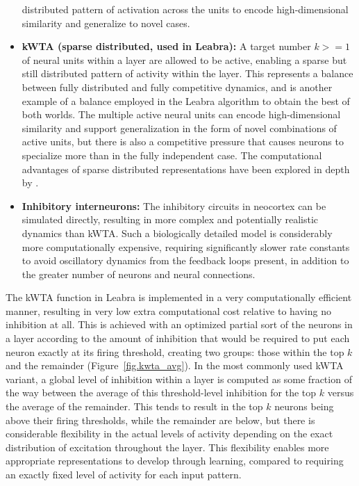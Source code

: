 \documentclass[11pt,twoside]{article}
\begin{document}
\begin{itemize}
  distributed pattern of activation across the units to encode
  high-dimensional similarity and generalize to novel cases.
\item {\bf kWTA (sparse distributed, used in Leabra):} A target number
  $k>=1$ of neural units within a layer are allowed to be active,
  enabling a sparse but still distributed pattern of activity within
  the layer.  This represents a balance between fully distributed and
  fully competitive dynamics, and is another example of a balance
  employed in the Leabra algorithm to obtain the best of both worlds.
  The multiple active neural units can encode high-dimensional
  similarity and support generalization in the form of novel
  combinations of active units, but there is also a competitive
  pressure that causes neurons to specialize more than in the fully
  independent case.  The computational advantages of sparse
  distributed representations have been explored in depth by
  .
\item {\bf Inhibitory interneurons:} The inhibitory circuits in
  neocortex can be simulated directly, resulting in more complex and
  potentially realistic dynamics than kWTA.  Such a biologically
  detailed model is considerably more computationally expensive,
  requiring significantly slower rate constants to avoid oscillatory
  dynamics from the feedback loops present, in addition to the greater
  number of neurons and neural connections.
\end{itemize}

The kWTA function in Leabra is implemented in a very computationally
efficient manner, resulting in very low extra computational cost
relative to having no inhibition at all.  This is achieved with an
optimized partial sort of the neurons in a layer according to the
amount of inhibition that would be required to put each neuron exactly
at its firing threshold, creating two groups: those within the top $k$
and the remainder (Figure~\ref{fig.kwta_avg}).  In the most commonly
used kWTA variant, a global level of inhibition within a layer is
computed as some fraction of the way between the average of this
threshold-level inhibition for the top $k$ versus the average of the
remainder.  This tends to result in the top $k$ neurons being above
their firing thresholds, while the remainder are below, but there is
considerable flexibility in the actual levels of activity depending on
the exact distribution of excitation throughout the layer.  This
flexibility enables more appropriate representations to develop
through learning, compared to requiring an exactly fixed level of
activity for each input pattern.
\end{document}
